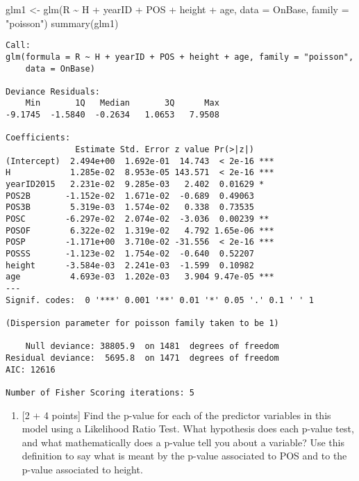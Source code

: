 \documentclass[
]{article}
\newenvironment{Shaded}{\begin{snugshade}}{\end{snugshade}}
\newcommand{\AttributeTok}[1]{\textcolor[rgb]{0.77,0.63,0.00}{#1}}
\newcommand{\FunctionTok}[1]{\textcolor[rgb]{0.00,0.00,0.00}{#1}}
\newcommand{\NormalTok}[1]{#1}
\newcommand{\OtherTok}[1]{\textcolor[rgb]{0.56,0.35,0.01}{#1}}
\newcommand{\SpecialCharTok}[1]{\textcolor[rgb]{0.00,0.00,0.00}{#1}}
\newcommand{\StringTok}[1]{\textcolor[rgb]{0.31,0.60,0.02}{#1}}
\providecommand{\tightlist}{%
  \setlength{\itemsep}{0pt}\setlength{\parskip}{0pt}}
\begin{document}
\begin{Shaded}
\begin{Highlighting}[]
\NormalTok{glm1 }\OtherTok{\textless{}{-}} \FunctionTok{glm}\NormalTok{(R }\SpecialCharTok{\textasciitilde{}}\NormalTok{ H }\SpecialCharTok{+}\NormalTok{ yearID }\SpecialCharTok{+}\NormalTok{ POS }\SpecialCharTok{+}\NormalTok{ height }\SpecialCharTok{+}\NormalTok{ age, }\AttributeTok{data =}\NormalTok{ OnBase, }\AttributeTok{family =} \StringTok{"poisson"}\NormalTok{)}
\FunctionTok{summary}\NormalTok{(glm1)}
\end{Highlighting}
\end{Shaded}

\begin{verbatim}
Call:
glm(formula = R ~ H + yearID + POS + height + age, family = "poisson", 
    data = OnBase)

Deviance Residuals: 
    Min       1Q   Median       3Q      Max  
-9.1745  -1.5840  -0.2634   1.0653   7.9508  

Coefficients:
              Estimate Std. Error z value Pr(>|z|)    
(Intercept)  2.494e+00  1.692e-01  14.743  < 2e-16 ***
H            1.285e-02  8.953e-05 143.571  < 2e-16 ***
yearID2015   2.231e-02  9.285e-03   2.402  0.01629 *  
POS2B       -1.152e-02  1.671e-02  -0.689  0.49063    
POS3B        5.319e-03  1.574e-02   0.338  0.73535    
POSC        -6.297e-02  2.074e-02  -3.036  0.00239 ** 
POSOF        6.322e-02  1.319e-02   4.792 1.65e-06 ***
POSP        -1.171e+00  3.710e-02 -31.556  < 2e-16 ***
POSSS       -1.123e-02  1.754e-02  -0.640  0.52207    
height      -3.584e-03  2.241e-03  -1.599  0.10982    
age          4.693e-03  1.202e-03   3.904 9.47e-05 ***
---
Signif. codes:  0 '***' 0.001 '**' 0.01 '*' 0.05 '.' 0.1 ' ' 1

(Dispersion parameter for poisson family taken to be 1)

    Null deviance: 38805.9  on 1481  degrees of freedom
Residual deviance:  5695.8  on 1471  degrees of freedom
AIC: 12616

Number of Fisher Scoring iterations: 5
\end{verbatim}

\begin{enumerate}
\def\labelenumi{\alph{enumi}.}
\setcounter{enumi}{2}
\tightlist
\item
  {[}2 + 4 points{]} Find the p-value for each of the predictor
  variables in this model using a Likelihood Ratio Test. What hypothesis
  does each p-value test, and what mathematically does a p-value tell
  you about a variable? Use this definition to say what is meant by the
  p-value associated to POS and to the p-value associated to height.
\end{enumerate}
\end{document}
